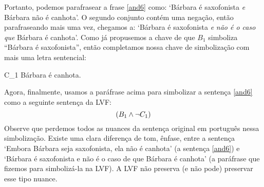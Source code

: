 Portanto, podemos parafrasear a frase \ref{and6} como: `Bárbara é saxofonista \emph{e} Bárbara não é canhota'.
O segundo conjunto contém uma negação, então parafraseando mais uma vez, chegamos a: `Bárbara é saxofonista \emph{e} \emph{não é o caso que} Bárbara é canhota'.
Como já propusemos a chave de que $B_1$ simboliza ``Bárbara é saxofonista'', então completamos nossa chave de simbolização com mais uma letra sentencial:
	\begin{ekey}
		\item[C_1] Bárbara é canhota.
	\end{ekey}
Agora, finalmente, usamos a paráfrase acima para simbolizar a sentença \ref{and6} como a seguinte sentença da LVF:
$$(B_1 \wedge \neg C_1)$$
Observe que perdemos todos as nuances da sentença original em português nessa simbolização.
Existe uma clara diferença de tom, ênfase, entre a sentença `Embora Bárbara seja saxofonista, ela não é canhota' (a sentença \ref{and6}) e `Bárbara é saxofonista e não é o caso de que Bárbara é canhota' (a paráfrase que fizemos para simbolizá-la na LVF).
A LVF não preserva (e não pode) preservar esse tipo nuance.


